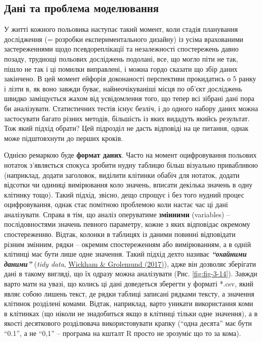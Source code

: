 \documentclass[
  11pt,
]{book}
\begin{document}
\subsection{Дані та проблема моделювання}\label{regression}

У житті кожного польовика наступає такий момент, коли стадія планування дослідження (= розробки експериментального дизайну) із усіма врахованими застереженнями щодо псевдореплікації та незалежності спостережень давно позаду, труднощі польових досліджень подолані, все, що могло піти не так, пішло не так і ці помилки виправлені, і можна гордо сказати що збір даних закінчено. В цей момент ейфорія доконаності перспективи прокидатись о 5 ранку і лізти в, як воно завжди буває, найнеочікуваніші місця по об'єкт досліджень швидко заміщується жахом від усвідомлення того, що тепер всі зібрані дані пора би аналізувати. Статистичних тестів існує безліч, і до одного набору даних можна застосувати багато різних методів, більшість із яких видадуть якийсь результат. Тож який підхід обрати? Цей підрозділ не дасть відповіді на це питання, однак може підштовхнути до перших кроків.

Однією ремаркою буде \textbf{формат даних}. Часто на момент оцифровування польових нотаток з'являється спокуса зробити нудну таблицю більш візуально привабливою (наприклад, додати заголовок, виділити клітинки обабіч для нотаток, додати відсотки чи одиниці вимірювання коло значень, вписати декілька значень в одну клітинку тощо). Такий підхід, звісно, дещо спрощує і без того нудний процес оцифровування, однак стає помітною проблемою коли настає час ці дані аналізувати. Справа в тім, що аналіз оперуватиме \textbf{змінними} (variables) -- послідовностями значень певного параметру, кожне з яких відповідає окремому спостереженню. Відтак, колонки в таблицях із даними повинні відповідати різним змінним, рядки -- окремим спостереженням або вимірюванням, а в одній клітинці має бути лише одне значення. Такий підхід дехто називає \textbf{\emph{``охайними даними''}} (\emph{tidy data}, \href{https://r4ds.had.co.nz/tidy-data.html}{Wickham \& Grolemund (2017)}), адже він дозволяє зберігати дані в такому вигляді, що їх одразу можна аналізувати (Рис. \ref{fig:fig-3-14}). Завжди варто мати на увазі, що колись ці дані доведеться зберегти у форматі *.csv, який являє собою лишень текст, де рядки таблиці записані рядками тексту, а значення клітинок розділені комами. Відтак, наприклад, варто уникати використання коми в клітинках (що ніколи не знадобиться якщо в клітинці тільки одне значення), а в якості десяткового розділювача використовувати крапку (``одна десята'' має бути ``0.1'', а не ``0,1'' -- програма на кшталт R просто не зрозуміє що то за кома).
\end{document}
